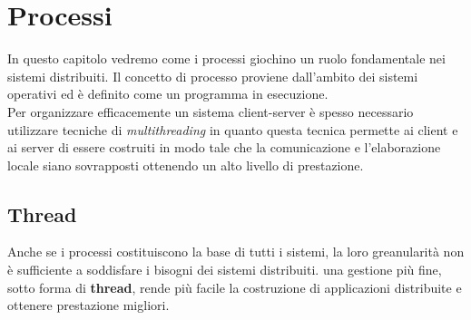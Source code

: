 \section{Processi}\label{capitolo4}
In questo capitolo vedremo come i processi giochino un ruolo fondamentale nei sistemi distribuiti. Il concetto di processo proviene dall'ambito dei sistemi operativi ed è definito come un programma in esecuzione.\\
Per organizzare efficacemente un sistema client-server è spesso necessario utilizzare tecniche di \emph{multithreading} in quanto questa tecnica permette ai client e ai server di essere costruiti in modo tale che la comunicazione e l'elaborazione locale siano sovrapposti ottenendo un alto livello di prestazione.
\subsection{Thread}
Anche se i processi costituiscono la base di tutti i sistemi, la loro greanularità non è sufficiente a soddisfare i bisogni dei sistemi distribuiti. una gestione più fine, sotto forma di \textbf{thread}, rende più facile la costruzione di applicazioni distribuite e ottenere prestazione migliori.
